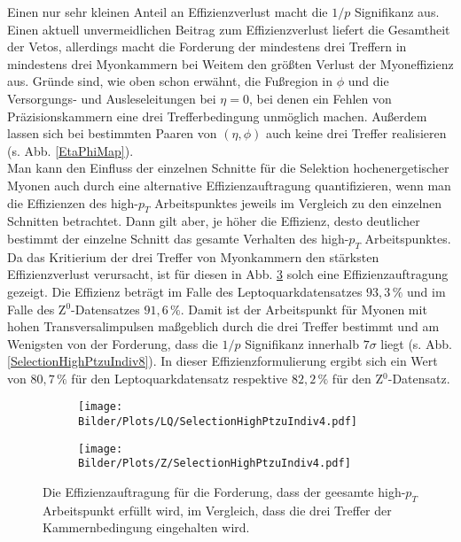 Einen nur sehr kleinen Anteil an Effizienzverlust macht die $1/p$ Signifikanz aus. Einen aktuell unvermeidlichen Beitrag zum Effizienzverlust liefert die Gesamtheit der Vetos, allerdings macht die Forderung der mindestens drei Treffern in mindestens drei Myonkammern bei Weitem den größten Verlust der Myoneffizienz aus. Gründe sind, wie oben schon erwähnt, die Fußregion in $\phi$ und die Versorgungs- und Ausleseleitungen bei $\eta=0$, bei denen ein Fehlen von Präzisionskammern eine drei Trefferbedingung unmöglich machen. Außerdem lassen sich bei bestimmten Paaren von $(\eta,\phi)$ auch keine drei Treffer realisieren (s. Abb. \ref{EtaPhiMap}).\\
Man kann den Einfluss der einzelnen Schnitte für die Selektion hochenergetischer Myonen auch durch eine alternative Effizienzauftragung quantifizieren, wenn man die Effizienzen des high-$p_T$ Arbeitspunktes jeweils im Vergleich zu den einzelnen Schnitten betrachtet. Dann gilt aber, je höher die Effizienz, desto deutlicher be\-stimmt der einzelne Schnitt das gesamte Verhalten des high-$p_T$ Arbeitspunktes. Da das Kritierium der drei Treffer von Myonkammern den stärksten Effizienzverlust verursacht, ist für diesen in Abb. \ref{SelectionHighPtzuIndiv4} solch eine Effizienzauftragung gezeigt. Die Effizienz beträgt im Falle des Leptoquarkdatensatzes $93,3\,\%$ und im Falle des Z$^0$-Datensatzes $91,6\,\%$. Damit ist der Arbeitspunkt für Myonen mit hohen Transversalimpulsen maßgeblich durch die drei Treffer bestimmt und am Wenigsten von der Forderung, dass die $1/p$ Signifikanz innerhalb $7\sigma$ liegt (s. Abb. \ref{SelectionHighPtzuIndiv8}). In dieser Effizienzformulierung ergibt sich ein Wert von $80,7\,\%$ für den Leptoquarkdatensatz respektive $82,2\,\%$ für den Z$^0$-Datensatz.
\begin{figure}
  \begin{subfigure}[t]{0.55\textwidth}
  \texttt{[image: Bilder/Plots/LQ/SelectionHighPtzuIndiv4.pdf]}
  \label{SelectionHighPtzuIndiv4LQ}
  \end{subfigure}
\begin{subfigure}[t]{0.55\textwidth}
 \texttt{[image: Bilder/Plots/Z/SelectionHighPtzuIndiv4.pdf]}
  \label{SelectionHighPtzuIndiv4Z}
\end{subfigure}
\caption{Die Effizienzauftragung für die Forderung, dass der geesamte high-$p_T$ Arbeitspunkt erfüllt wird, im Vergleich, dass die drei Treffer der Kammernbedingung eingehalten wird.}
\label{SelectionHighPtzuIndiv4}
\end{figure}
